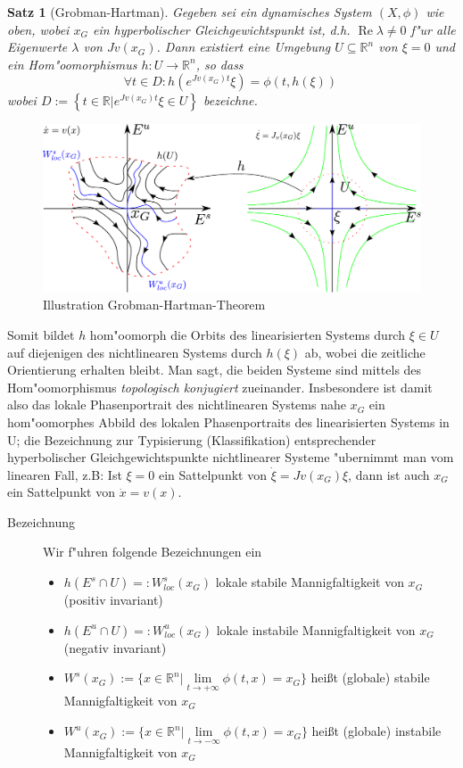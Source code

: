 \documentclass[a4paper, 13pt]{scrreprt}
\newtheorem{satz}{Satz}[section]
\theoremstyle{definition} \newtheorem{definition}{Definition}[section]
\newcommand{\RR}{\mathbb{R}}
\begin{document}
\begin{satz}[Grobman-Hartman]\label{Grobman-Hartman}
Gegeben sei ein dynamisches System $(X,\phi)$ wie oben, wobei $x_G$ ein hyperbolischer Gleichgewichtspunkt ist, d.h. $\operatorname{Re}\lambda \neq 0$ f"ur alle Eigenwerte $\lambda$ von $Jv(x_G)$. Dann existiert eine Umgebung $U\subseteq \RR^n$ von $\xi =0$ und ein Hom"oomorphismus $h:U\to\mathbb{R}^n$, so dass \[ \forall t\in D: h(e^{Jv(x_G)t}\xi)=\phi(t,h(\xi))\ \] wobei $D := \left \{ \left . t \in \RR \right| e^{Jv(x_G)t}\xi \in U \right \}$ bezeichne.
\end{satz}
\begin{figure}[htpb]
		\centering
		\includegraphics[width=1\textwidth]{img/grobman-hartman.pdf}
		\caption{Illustration Grobman-Hartman-Theorem}
\end{figure}

Somit bildet $h$ hom"oomorph die Orbits des linearisierten Systems durch $\xi\in U$ auf diejenigen des nichtlinearen Systems durch $h(\xi)$ ab, wobei die zeitliche Orientierung erhalten bleibt. Man sagt, die beiden Systeme sind mittels des Hom"oomorphismus \emph{topologisch konjugiert} zueinander. Insbesondere ist damit also das lokale Phasenportrait des nichtlinearen Systems nahe $x_G$ ein hom"oomorphes Abbild des lokalen Phasenportraits des linearisierten Systems in U; die Bezeichnung zur Typisierung (Klassifikation) entsprechender hyperbolischer Gleichgewichtspunkte nichtlinearer Systeme "ubernimmt man vom linearen Fall, z.B: Ist $\xi =0$ ein Sattelpunkt von $\dot{\xi}=Jv(x_G)\xi$, dann ist auch $x_G$ ein Sattelpunkt von $\dot{x}=v(x)$.

\begin{description}
\item[Bezeichnung]Wir f"uhren folgende Bezeichnungen ein
\begin{itemize}
\item $h(E^s\cap U)=: W_{loc}^s(x_G)$ lokale stabile Mannigfaltigkeit von $x_G$ (positiv invariant)\\
\item $h(E^u\cap U)=: W_{loc}^u(x_G)$ lokale instabile Mannigfaltigkeit von $x_G$ (negativ invariant)\\
\item $W^s(x_G):=\{x\in\mathbb{R}^n|\lim\limits_{t\to +\infty}\phi (t,x)=x_G\}$ heißt (globale) stabile Mannigfaltigkeit von $x_G$\\
\item $W^u(x_G):=\{x\in\mathbb{R}^n|\lim\limits_{t\to -\infty}\phi (t,x)=x_G\}$ heißt (globale) instabile Mannigfaltigkeit von $x_G$
\end{itemize}
\end{description}
\end{document}
